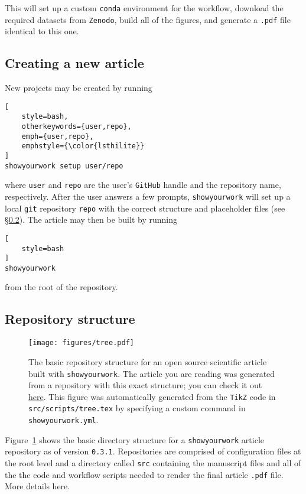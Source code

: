 \documentclass{aastex631}
\newcommand\VERSION{0.3.1}
\newcommand\xxx[1]{{\color{red}#1}}
\newcommand\syw{\texttt{showyourwork}\xspace}
\newcommand\repourl{https://github.com/showyourwork/showyourwork-paper}
\newcommand\commiturl{\repourl/tree/\GitHubSHA}
\begin{document}
\noindent This will set up a custom \texttt{conda} environment for the workflow, download the required datasets from \texttt{Zenodo}, build all of the figures, and generate a \texttt{.pdf} file identical to this one.

\subsection{Creating a new article}
\label{sec:usage:new}
New projects may be created by running\\

\noindent\begin{minipage}{\linewidth}
\begin{lstlisting}[
    style=bash,
    otherkeywords={user,repo},
    emph={user,repo},
    emphstyle={\color{lsthilite}}
]
showyourwork setup user/repo
\end{lstlisting}
\end{minipage}

\noindent where \texttt{\color{lsthilite}user} and \texttt{\color{lsthilite}repo} are the user's \texttt{GitHub} handle and the repository name, respectively. 
After the user answers a few prompts, \syw will set up a local \texttt{git} repository \texttt{\color{lsthilite}repo} with the correct structure and placeholder files (see \S\ref{sec:usage:struct}).
The article may then be built by running\\

\noindent\begin{minipage}{\linewidth}
\begin{lstlisting}[
    style=bash
]
showyourwork
\end{lstlisting}
\end{minipage}

\noindent from the root of the repository.

\subsection{Repository structure}
\label{sec:usage:struct}
%
\begin{figure}[p!]
    \begin{centering}
        \texttt{[image: figures/tree.pdf]}
        \caption{
            The basic repository structure for an open source scientific article built with \syw.
            The article you are reading was generated from a repository with this exact structure; you can check it out \href{\commiturl}{here}.
            This figure was automatically generated from the \texttt{TikZ} code in \texttt{src/scripts/tree.tex} by specifying a custom command in \texttt{showyourwork.yml}.
        }
        \label{fig:tree}
    \end{centering}
\end{figure}
%
Figure~\ref{fig:tree} shows the basic directory structure for a \syw article repository as of version \texttt{\VERSION}.
Repositories are comprised of configuration files at the root level and a directory called \texttt{src} containing the manuscript files and all of the the code and workflow scripts needed to render the final article \texttt{.pdf} file.
%
\xxx{More details here.}
\end{document}
